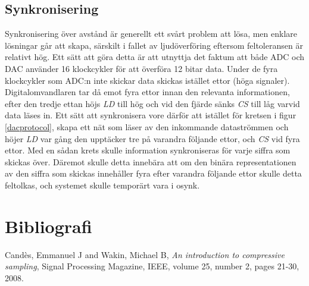 \documentclass[a4paper,10pt]{article}
\begin{document}
\subsection{Synkronisering}
\label{synkronisering}
Synkronisering över avstånd är generellt ett svårt problem att lösa, men enklare lösningar går att skapa, särskilt i fallet av ljudöverföring eftersom feltoleransen är relativt hög. Ett sätt att göra detta är att utnyttja det faktum att både ADC och DAC använder 16 klockcykler för att överföra 12 bitar data. Under de fyra klockcykler som ADC:n inte skickar data skickas istället ettor (höga signaler). Digitalomvandlaren tar då emot fyra ettor innan den relevanta informationen, efter den tredje ettan höjs \emph{LD} till hög och vid den fjärde sänks \emph{CS} till låg varvid data läses in. Ett sätt att synkronisera vore därför att istället för kretsen i figur \ref{dacprotocol}, skapa ett nät som läser av den inkommande dataströmmen och höjer \emph{LD} var gång den upptäcker tre på varandra följande ettor, och \emph{CS} vid fyra ettor. Med en sådan krets skulle information synkroniseras för varje siffra som skickas över. Däremot skulle detta innebära att om den binära representationen av den siffra som skickas innehåller fyra efter varandra följande ettor skulle detta feltolkas, och systemet skulle temporärt vara i osynk.


\section{Bibliografi}

\begin{thebibliography}{hejhej}

    {Cand{\`e}s, Emmanuel J and Wakin, Michael B,
    \emph{An introduction to compressive sampling},
    Signal Processing Magazine, IEEE,
    volume 25,
    number 2,
    pages 21-30,
    2008.
}
\end{thebibliography}
\end{document}
